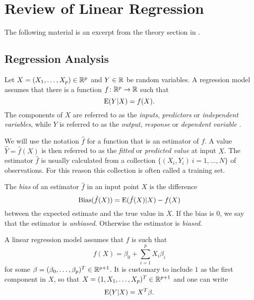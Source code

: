 \section{Review of Linear Regression}\label{sec:Appendix A}
The following material is an excerpt from the theory section in \cite{PROJone}.

\subsection{Regression Analysis}\label{sec:RegressAnal theory}
Let $X=(X_1,\ldots,X_p)\in\mathbb{R}^p$ and $Y\in\mathbb{R}$ be random variables. A regression model assumes that there is a function $f\colon \mathbb{R}^p\to \mathbb{R}$ such that
\[
\mathrm{E}(Y|X) = f(X).
\]
The components of $X$ are referred to as the \emph{inputs}, \emph{predictors} or \emph{independent variables}, while $Y$ is referred to as the \emph{output}, \emph{response} or \emph{dependent variable} \cite[9]{ESL}.

We will use the notation $\hat{f}$ for a function that is an estimator of $f$. A value $\hat{Y} = \hat{f}(X)$ is then referred to as the \emph{fitted} or \emph{predicted value} at input $X$. The estimator $\hat{f}$ is usually calculated from a collection $\{(X_i,Y_i)\:i=1,\ldots,N\}$ of observations. For this reason this collection is often called a training set.

The \emph{bias} of an estimator $\hat{f}$ in an input point $X$ is the difference
\begin{equation*}
    \mathrm{Bias}(\hat{f}(X)) = \mathrm{E}(\hat{f}(X)|X)-f(X)
\end{equation*}
between the expected estimate and the true value in $X$. If the bias is $0$, we say that the estimator is \emph{unbiased}. Otherwise the estimator is \emph{biased}.

A linear regression model assumes that $f$ is such that
\[
f(X) = \beta_0 +\sum_{i=1}^pX_i\beta_i
\]
for some $\beta=(\beta_0,\ldots,\beta_p)^T\in\mathbb{R}^{p+1}$. It is customary to include $1$ as the first component in $X$, so that $X=(1,X_1,\ldots,X_p)^T\in\mathbb{R}^{p+1}$ and one can write
\[
\mathrm{E}(Y|X) = X^T\beta.
\]
